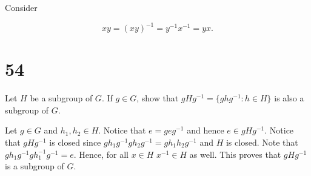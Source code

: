 \documentclass[a4paper]{article}
\begin{document}
Consider

$$xy = (xy)^{-1} = y^{-1} x^{-1} = yx.$$


\section*{54}

Let $H$ be a subgroup of $G$. If $g \in G$, show that $gHg^{-1} = \{ghg^{-1}: h \in H \}$ is also a subgroup of $G$.

\vspace{\baselineskip}

Let $g \in G$ and $h_1, h_2 \in H$. Notice that $e = geg^{-1}$ and hence $e \in gHg^{-1}$. Notice that $gHg^{-1}$ is closed since $gh_1g^{-1} g h_2 g^{-1} = g h_1 h_2 g^{-1}$ and $H$ is closed. Note that $g h_1 g^{-1} g h_1^{-1} g^{-1} = e$. Hence, for all $x \in H$ $x^{-1} \in H$ as well. This proves that $gHg^{-1}$ is a subgroup of $G$.
\end{document}
